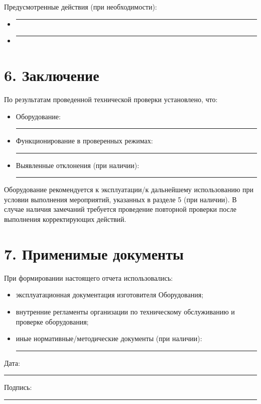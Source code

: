\documentclass[12pt]{article}
\begin{document}
\noindent Предусмотренные действия (при необходимости):
\begin{itemize}
    \item \rule{0.95\linewidth}{0.4pt}
    \item \rule{0.95\linewidth}{0.4pt}
\end{itemize}

\vspace{0.5cm}

\section*{6. Заключение}
\noindent По результатам проведенной технической проверки установлено, что:
\begin{itemize}
    \item Оборудование: \rule{0.95\linewidth}{0.4pt}
    \item Функционирование в проверенных режимах: \rule{0.95\linewidth}{0.4pt}
    \item Выявленные отклонения (при наличии): \rule{0.95\linewidth}{0.4pt}
\end{itemize}

\noindent Оборудование рекомендуется к эксплуатации/к дальнейшему использованию при условии выполнения мероприятий, указанных в разделе 5 (при наличии). В случае наличия замечаний требуется проведение повторной проверки после выполнения корректирующих действий.

\vspace{0.5cm}

\section*{7. Применимые документы}
\noindent При формировании настоящего отчета использовались:
\begin{itemize}
    \item эксплуатационная документация изготовителя Оборудования;
    \item внутренние регламенты организации по техническому обслуживанию и проверке оборудования;
    \item иные нормативные/методические документы (при наличии): \rule{0.9\linewidth}{0.4pt}
\end{itemize}

\vfill

\noindent
Дата: \rule{5cm}{0.4pt} \hfill Подпись: \rule{5cm}{0.4pt}
\end{document}
